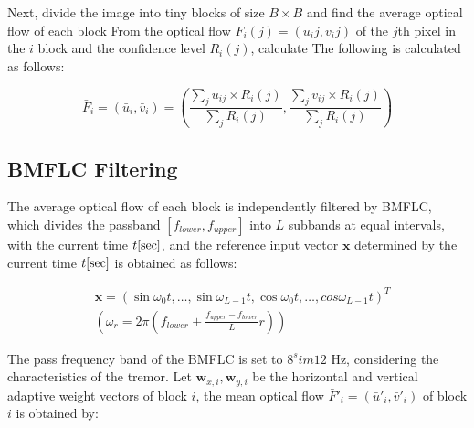 Next, divide the image into tiny blocks of size $B \times B$ and find the average optical flow
of each block From the optical flow $F_i(j)=(u_ij,v_ij)$ of the $j$th pixel
in the $i$ block and the confidence level $R_i(j)$,
calculate The following is calculated as follows:

\begin{equation}
  \label{equ:block_opt}
   \bar F_i=(\bar u_i,\bar v_i)=
   \left(   \frac{ \sum_ju_{ij} \times R_i(j) }{\sum_jR_i(j)} , \frac{ \sum_jv_{ij} \times R_i(j) }{\sum_jR_i(j)} \right)
\end{equation}


\subsection{BMFLC Filtering}\label{subsection:BMFLC_filtering}



The average optical flow of each block is independently filtered by BMFLC,
which divides the passband $[f_{\mathit{lower}},f_{\mathit{upper}}]$ into
$L$ subbands at equal intervals, with the current time $t[\rm{sec}]$,
and the reference input vector $\bm{x}$ determined
by the current time $t[{\rm{sec}}]$ is obtained as follows:

\begin{align}
  \label{equ:Vector}
  & \bm{x} = (\sin \omega_0t,\ldots,\sin \omega_{L-1}t,
  \cos \omega_0t,\ldots,cos \omega_{L-1}t)^T \\
  &  \left(
  \omega_r=2\pi \left( f_{\mathit{lower}} +
  \frac{f_{\mathit{upper}}-f_{\mathit{lower}}}{L}r \right)
  \right)
\end{align}
  

   


The pass frequency band of the BMFLC is set to $8^sim12$ Hz, considering the characteristics of the tremor.
Let $\bm{w}_{x,i},\bm{w}_{y,i}$ be the horizontal and vertical adaptive weight vectors of block $i$,
the mean optical flow $\bar F'_i=(\bar u'_i,\bar v'_i)$ of block $i$ is obtained by:


